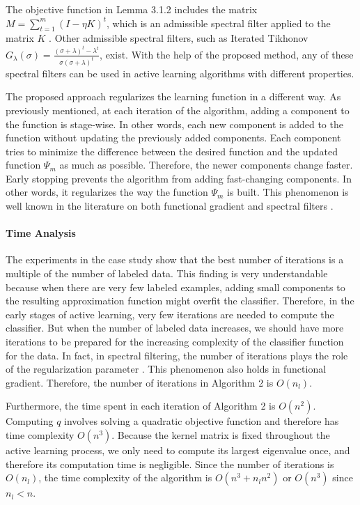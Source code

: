 \documentclass[12pt]{article}
\begin{document}
	The objective function in Lemma 3.1.2 includes the matrix $M = \sum_{t=1}^{m} (I - \eta K)^t$, which is an admissible spectral filter applied to the matrix $K$ \cite{borwein1997convex}. Other admissible spectral filters, such as Iterated Tikhonov $G_\lambda(\sigma) = \frac{(\sigma + \lambda)^t - \lambda^t}{\sigma(\sigma + \lambda)^t}$, exist. With the help of the proposed method, any of these spectral filters can be used in active learning algorithms with different properties.
	
	The proposed approach regularizes the learning function in a different way. As previously mentioned, at each iteration of the algorithm, adding a component to the function is stage-wise. In other words, each new component is added to the function without updating the previously added components. Each component tries to minimize the difference between the desired function and the updated function $\Psi_m$ as much as possible. Therefore, the newer components change faster. Early stopping prevents the algorithm from adding fast-changing components. In other words, it regularizes the way the function $\Psi_m$ is built. This phenomenon is well known in the literature on both functional gradient and spectral filters \cite{borwein1997convex, friedman2001greedy}.
	
	\paragraph{Time Analysis}
	The experiments in the case study show that the best number of iterations is a multiple of the number of labeled data. This finding is very understandable because when there are very few labeled examples, adding small components to the resulting approximation function might overfit the classifier. Therefore, in the early stages of active learning, very few iterations are needed to compute the classifier. But when the number of labeled data increases, we should have more iterations to be prepared for the increasing complexity of the classifier function for the data. In fact, in spectral filtering, the number of iterations plays the role of the regularization parameter \cite{borwein1997convex}. This phenomenon also holds in functional gradient. Therefore, the number of iterations in Algorithm 2 is $O(n_l)$.
	
	Furthermore, the time spent in each iteration of Algorithm 2 is $O(n^2)$. Computing $q$ involves solving a quadratic objective function and therefore has time complexity $O(n^3)$. Because the kernel matrix is fixed throughout the active learning process, we only need to compute its largest eigenvalue once, and therefore its computation time is negligible. Since the number of iterations is $O(n_l)$, the time complexity of the algorithm is $O(n^3 + n_l n^2)$ or $O(n^3)$ since $n_l < n$.
	
\end{document}
